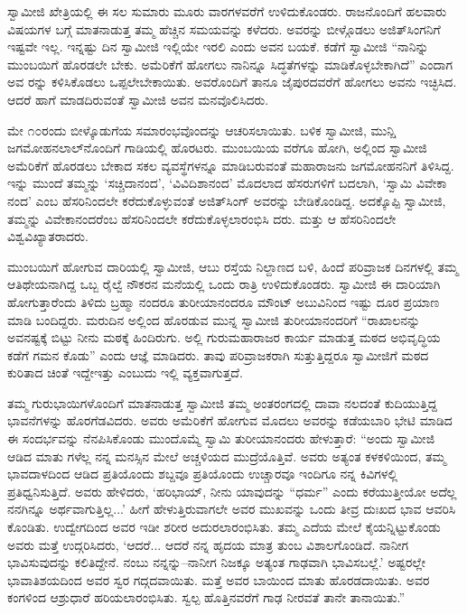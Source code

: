 ಸ್ವಾಮೀಜಿ ಖೇತ್ರಿಯಲ್ಲಿ ಈ ಸಲ ಸುಮಾರು ಮೂರು ವಾರಗಳವರೆಗೆ ಉಳಿದುಕೊಂಡರು. ರಾಜನೊಂದಿಗೆ ಹಲವಾರು ವಿಷಯಗಳ ಬಗ್ಗೆ ಮಾತನಾಡುತ್ತ ತಮ್ಮ ಹೆಚ್ಚಿನ ಸಮಯವನ್ನು ಕಳೆದರು. ಅವರನ್ನು ಬೀಳ್ಗೊಡಲು ಅಜಿತ್​ಸಿಂಗನಿಗೆ ಇಷ್ಟವೇ ಇಲ್ಲ. ಇನ್ನಷ್ಟು ದಿನ ಸ್ವಾಮೀಜಿ ಇಲ್ಲಿಯೇ ಇರಲಿ ಎಂದು ಅವನ ಬಯಕೆ. ಕಡೆಗೆ ಸ್ವಾಮೀಜಿ “ನಾನಿನ್ನು ಮುಂಬಯಿಗೆ ಹೊರಡಲೇ ಬೇಕು. ಅಮೆರಿಕೆಗೆ ಹೋಗಲು ನಾನಿನ್ನೂ ಸಿದ್ಧತೆಗಳನ್ನು ಮಾಡಿಕೊಳ್ಳಬೇಕಾಗಿದೆ” ಎಂದಾಗ ಅವ ರನ್ನು ಕಳಿಸಿಕೊಡಲು ಒಪ್ಪಲೇಬೇಕಾಯಿತು. ಅವರೊಂದಿಗೆ ತಾನೂ ಜೈಪುರದವರೆಗೆ ಹೋಗಲು ಅವನು ಇಚ್ಛಿಸಿದ. ಆದರೆ ಹಾಗೆ ಮಾಡದಿರುವಂತೆ ಸ್ವಾಮೀಜಿ ಅವನ ಮನವೊಲಿಸಿದರು.

ಮೇ ೧೦ರಂದು ಬೀಳ್ಕೊಡುಗೆಯ ಸಮಾರಂಭವೊಂದನ್ನು ಆಚರಿಸಲಾಯಿತು. ಬಳಿಕ ಸ್ವಾಮೀಜಿ, ಮುನ್ಷಿ ಜಗಮೋಹನಲಾಲ್​ನೊಂದಿಗೆ ಗಾಡಿಯಲ್ಲಿ ಹೊರಟರು. ಮುಂಬಯಿಯ ವರೆಗೂ ಹೋಗಿ, ಅಲ್ಲಿಂದ ಸ್ವಾಮೀಜಿ ಅಮೆರಿಕೆಗೆ ಹೊರಡಲು ಬೇಕಾದ ಸಕಲ ವ್ಯವಸ್ಥೆಗಳನ್ನೂ ಮಾಡಿಬರುವಂತೆ ಮಹಾರಾಜನು ಜಗಮೋಹನನಿಗೆ ತಿಳಿಸಿದ್ದ. ಇನ್ನು ಮುಂದೆ ತಮ್ಮನ್ನು ‘ಸಚ್ಚಿದಾನಂದ’, ‘ವಿವಿದಿಶಾನಂದ’ ಮೊದಲಾದ ಹೆಸರುಗಳಿಗೆ ಬದಲಾಗಿ, ‘ಸ್ವಾಮಿ ವಿವೇಕಾ ನಂದ’ ಎಂಬ ಹೆಸರಿನಿಂದಲೇ ಕರೆದುಕೊಳ್ಳುವಂತೆ ಅಜಿತ್​ಸಿಂಗ್ ಅವರನ್ನು ಬೇಡಿಕೊಂಡಿದ್ದ. ಅದಕ್ಕೊಪ್ಪಿ ಸ್ವಾಮೀಜಿ, ತಮ್ಮನ್ನು ವಿವೇಕಾನಂದರೆಂಬ ಹೆಸರಿನಿಂದಲೇ ಕರೆದುಕೊಳ್ಳಲಾರಂಭಿಸಿ ದರು. ಮತ್ತು ಆ ಹೆಸರಿನಿಂದಲೇ ವಿಶ್ವವಿಖ್ಯಾತರಾದರು.

ಮುಂಬಯಿಗೆ ಹೋಗುವ ದಾರಿಯಲ್ಲಿ ಸ್ವಾಮೀಜಿ, ಆಬು ರಸ್ತೆಯ ನಿಲ್ದಾಣದ ಬಳಿ, ಹಿಂದೆ ಪರಿವ್ರಾಜಕ ದಿನಗಳಲ್ಲಿ ತಮ್ಮ ಆತಿಥೇಯನಾಗಿದ್ದ ಒಬ್ಬ ರೈಲ್ವೆ ನೌಕರನ ಮನೆಯಲ್ಲಿ ಒಂದು ರಾತ್ರಿ ಉಳಿದುಕೊಂಡರು. ಸ್ವಾಮೀಜಿ ಈ ದಾರಿಯಾಗಿ ಹೋಗುತ್ತಾರೆಂದು ತಿಳಿದು ಬ್ರಹ್ಮಾ ನಂದರೂ ತುರೀಯಾನಂದರೂ ಮೌಂಟ್ ಅಬುವಿನಿಂದ ಇಷ್ಟು ದೂರ ಪ್ರಯಾಣ ಮಾಡಿ ಬಂದಿದ್ದರು. ಮರುದಿನ ಅಲ್ಲಿಂದ ಹೊರಡುವ ಮುನ್ನ ಸ್ವಾಮೀಜಿ ತುರೀಯಾನಂದರಿಗೆ “ರಾಖಾಲನನ್ನು ಅವನಷ್ಟಕ್ಕೆ ಬಿಟ್ಟು ನೀನು ಮಠಕ್ಕೆ ಹಿಂದಿರುಗು. ಅಲ್ಲಿ ಗುರುಮಹಾರಾಜರ ಕಾರ್ಯ ಮಾಡುತ್ತ ಮಠದ ಅಭಿವೃದ್ಧಿಯ ಕಡೆಗೆ ಗಮನ ಕೊಡು” ಎಂದು ಆಜ್ಞೆ ಮಾಡಿದರು. ತಾವು ಪರಿವ್ರಾಜಕರಾಗಿ ಸುತ್ತುತ್ತಿದ್ದರೂ ಸ್ವಾಮೀಜಿಗೆ ಮಠದ ಕುರಿತಾದ ಚಿಂತೆ ಇದ್ದೇಇತ್ತು ಎಂಬುದು ಇಲ್ಲಿ ವ್ಯಕ್ತವಾಗುತ್ತದೆ.

ತಮ್ಮ ಗುರುಭಾಯಿಗಳೊಂದಿಗೆ ಮಾತನಾಡುತ್ತ ಸ್ವಾಮೀಜಿ ತಮ್ಮ ಅಂತರಂಗದಲ್ಲಿ ದಾವಾ ನಲದಂತೆ ಕುದಿಯುತ್ತಿದ್ದ ಭಾವನೆಗಳನ್ನು ಹೊರಗೆಡವಿದರು. ಅವರು ಅಮೆರಿಕೆಗೆ ಹೋಗುವ ಮೊದಲು ಅವರನ್ನು ಕಡೆಯಬಾರಿ ಭೇಟಿ ಮಾಡಿದ ಈ ಸಂದರ್ಭವನ್ನು ನೆನಪಿಸಿಕೊಂಡು ಮುಂದೊಮ್ಮೆ ಸ್ವಾಮಿ ತುರೀಯಾನಂದರು ಹೇಳುತ್ತಾರೆ: “ಅಂದು ಸ್ವಾಮೀಜಿ ಆಡಿದ ಮಾತು ಗಳೆಲ್ಲ ನನ್ನ ಮನಸ್ಸಿನ ಮೇಲೆ ಅಚ್ಚಳಿಯದ ಮುದ್ರೆಯೊತ್ತಿವೆ. ಅವರು ಅತ್ಯಂತ ಕಳಕಳಿಯಿಂದ, ತಮ್ಮ ಭಾವದಾಳದಿಂದ ಆಡಿದ ಪ್ರತಿಯೊಂದು ಶಬ್ದವೂ ಪ್ರತಿಯೊಂದು ಉಚ್ಚಾರವೂ ಇಂದಿಗೂ ನನ್ನ ಕಿವಿಗಳಲ್ಲಿ ಪ್ರತಿಧ್ವನಿಸುತ್ತಿದೆ. ಅವರು ಹೇಳಿದರು, ‘ಹರಿಭಾಯ್, ನೀನು ಯಾವುದನ್ನು “ಧರ್ಮ” ಎಂದು ಕರೆಯುತ್ತೀಯೋ ಅದೆಲ್ಲ ನನಗಿನ್ನೂ ಅರ್ಥವಾಗುತ್ತಿಲ್ಲ...’ ಹೀಗೆ ಹೇಳುತ್ತಿರುವಾಗಲೇ ಅವರ ಮುಖವನ್ನು ಒಂದು ತೀವ್ರ ದುಃಖದ ಭಾವ ಆವರಿಸಿ ಕೊಂಡಿತು. ಉದ್ವೇಗದಿಂದ ಅವರ ಇಡೀ ಶರೀರ ಅದುರಲಾರಂಭಿಸಿತು. ತಮ್ಮ ಎದೆಯ ಮೇಲೆ ಕೈಯನ್ನಿಟ್ಟುಕೊಂಡು ಅವರು ಮತ್ತೆ ಉದ್ಗರಿಸಿದರು, ‘ಆದರೆ... ಆದರೆ ನನ್ನ ಹೃದಯ ಮಾತ್ರ ತುಂಬ ವಿಶಾಲಗೊಂಡಿದೆ. ನಾನೀಗ ಭಾವಿಸುವುದನ್ನು ಕಲಿತಿದ್ದೇನೆ. ನಂಬು ನನ್ನನ್ನು–ನಾನೀಗ ನಿಜಕ್ಕೂ ಅತ್ಯಂತ ಗಾಢವಾಗಿ ಭಾವಿಸಬಲ್ಲೆ.’ ಅಷ್ಟರಲ್ಲೇ ಭಾವಾತಿಶಯದಿಂದ ಅವರ ಸ್ವರ ಗದ್ಗದವಾಯಿತು. ಮತ್ತೆ ಅವರ ಬಾಯಿಂದ ಮಾತು ಹೊರಡದಾಯಿತು. ಅವರ ಕಂಗಳಿಂದ ಆಶ್ರುಧಾರೆ ಹರಿಯಲಾರಂಭಿಸಿತು. ಸ್ವಲ್ಪ ಹೊತ್ತಿನವರೆಗೆ ಗಾಢ ನೀರವತೆ ತಾನೇ ತಾನಾಯಿತು.”

